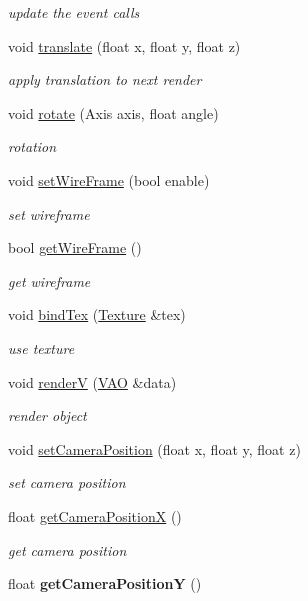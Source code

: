 \begin{DoxyCompactItemize}
\begin{DoxyCompactList}\small\item\em update the event calls \end{DoxyCompactList}\item 
void \hyperlink{class_render_engine_aa204613d418099a75efb240fb50025b5}{translate} (float x, float y, float z)
\begin{DoxyCompactList}\small\item\em apply translation to next render \end{DoxyCompactList}\item 
void \hyperlink{class_render_engine_ae848f09c3401e2320d037cf8f1aa41c6}{rotate} (Axis axis, float angle)
\begin{DoxyCompactList}\small\item\em rotation \end{DoxyCompactList}\item 
void \hyperlink{class_render_engine_aef04b2b6db3a023dcf9e92a55098d1ed}{set\-Wire\-Frame} (bool enable)
\begin{DoxyCompactList}\small\item\em set wireframe \end{DoxyCompactList}\item 
bool \hyperlink{class_render_engine_a99e16cbcc316fcbcc10df80db224bc2e}{get\-Wire\-Frame} ()
\begin{DoxyCompactList}\small\item\em get wireframe \end{DoxyCompactList}\item 
void \hyperlink{class_render_engine_afa295b21d41e28792bd175bc4792859a}{bind\-Tex} (\hyperlink{class_texture}{Texture} \&tex)
\begin{DoxyCompactList}\small\item\em use texture \end{DoxyCompactList}\item 
void \hyperlink{class_render_engine_a215dfb9663adfe099943c67f70504aaf}{render\-V} (\hyperlink{class_v_a_o}{V\-A\-O} \&data)
\begin{DoxyCompactList}\small\item\em render object \end{DoxyCompactList}\item 
void \hyperlink{class_render_engine_afd9aa16bd773fb102d7ee1bd711e4f12}{set\-Camera\-Position} (float x, float y, float z)
\begin{DoxyCompactList}\small\item\em set camera position \end{DoxyCompactList}\item 
float \hyperlink{class_render_engine_aba6e542657290bf6a94cab611066fc3e}{get\-Camera\-Position\-X} ()
\begin{DoxyCompactList}\small\item\em get camera position \end{DoxyCompactList}\item 
\hypertarget{class_render_engine_a5ac2b51f09ef60eae4f122c43d94bb8c}{float {\bfseries get\-Camera\-Position\-Y} ()}\label{class_render_engine_a5ac2b51f09ef60eae4f122c43d94bb8c}


\end{DoxyCompactItemize}
